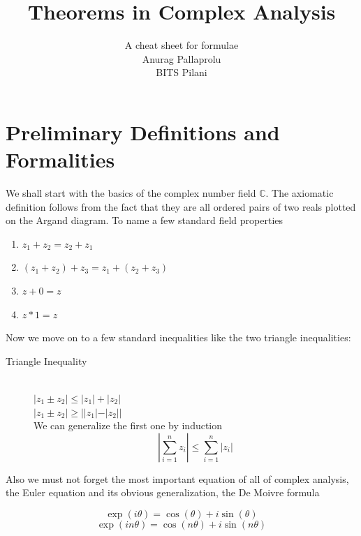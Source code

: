\documentclass[11pt]{article}
\begin{document}
\begin{sloppypar}
\title{Theorems in Complex Analysis}
\author{A cheat sheet for formulae \\Anurag Pallaprolu\\ BITS Pilani}
\maketitle
\tableofcontents
\setcounter{tocdepth}{3}
\clearpage
\section{Preliminary Definitions and Formalities}
We shall start with the basics of the complex number field $\mathbb{C}$. The axiomatic definition follows from the fact that they are all ordered pairs of two reals plotted on the Argand diagram. To name a few standard field properties

\begin{enumerate}

\item $z_{1} + z_{2} = z_{2} + z_{1}$

\item $(z_{1} + z_{2} )+ z_{3} = z_{1} + (z_{2}+z_{3})$
\item $z + 0 = z$
\item $z*1 = z$

\end{enumerate}

Now we move on to a few standard inequalities like the two triangle inequalities:

\begin{description}
\item[Triangle Inequality] \hfill \\
	$|z_{1}\pm z_{2}| \leq |z_{1}|+|z_{2}|$ \\
	$|z_{1}\pm z_{2}| \geq ||z_{1}|-|z_{2}||$ \\
	We can generalize the first one by induction\\
	\begin{equation}
	|\sum_{i=1}^{n} z_i| \leq \sum_{i=1}^{n} |z_i|
	\end{equation}
\end{description}

Also we must not forget the most important equation of all of complex analysis, the Euler equation and its obvious generalization, the De Moivre formula

\begin{equation}
	\tag{*}
	\exp(i\theta) = \cos(\theta) + i\sin(\theta)
	\label{eqn:Euler}
\end{equation}
\begin{equation}
	\exp(in\theta) = \cos(n\theta) + i\sin(n\theta)
\end{equation}


\end{sloppypar}
\end{document}

